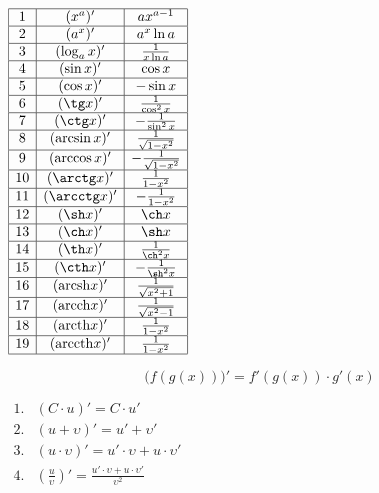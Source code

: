 \documentclass{article}
\newcommand{\arcsh}{\mathrm{arcsh}}
\newcommand{\arcch}{\mathrm{arcch}}
\newcommand{\arcth}{\mathrm{arcth}}
\newcommand{\arccth}{\mathrm{arccth}}
\begin{document}
$
\begin{array}{|c|c|c|}

  \hline
  1 &   (x^{a})'        & ax^{a-1}\\
  \hline
  2 &   (a^{x})'        & a^{x}\ln a\\
  \hline
  3 &   (\log_{a}x)'    & \frac{1}{x\ln a}\\
  \hline
  4 &   (\sin x)'       & \cos x\\
  \hline
  5 &   (\cos x)'       & -\sin x\\
  \hline
  6 &   (\tg x)'        & \frac{1}{\cos^{2} x}\\
  \hline
  7 &   (\ctg x)'       & -\frac{1}{\sin^{2} x}\\
  \hline
  8 &   (\arcsin x)'    & \frac{1}{\sqrt{1-x^{2}}}\\
  \hline
  9 &   (\arccos x)'    & -\frac{1}{\sqrt{1-x^{2}}}\\
  \hline
  10& (\arctg x)'       & \frac{1}{1-x^{2}}\\
  \hline
  11& (\arcctg x)'      & -\frac{1}{1-x^{2}}\\
  \hline
  12& (\sh x)'          & \ch x\\
  \hline
  13& (\ch x)'          & \sh x\\
  \hline
  14& (\th x)'          & \frac{1}{\ch^{2} x}\\
  \hline
  15& (\cth x)'         & -\frac{1}{\sh^{2} x}\\
  \hline
  16& (\arcsh x)'       & \frac{1}{\sqrt{x^{2}+1}}\\
  \hline
  17& (\arcch x)'       & \frac{1}{\sqrt{x^{2}-1}}\\
  \hline
  18& (\arcth x)'       & \frac{1}{1-x^{2}}\\
  \hline
  19& (\arccth x)'      & \frac{1}{1-x^{2}}\\
  \hline

\end{array}
$

\[   \Big(f(g(x))\Big) ' = f'(g(x)) \cdot g'(x)  \]

$
\begin{array}{cl}

  1.&  (C\cdot u)'                         =   C\cdot u'\\
  2.&  \left(u + \upsilon       \right)'   =   u' + \upsilon'\\
  3.&  \left(u\cdot \upsilon    \right)'   =   u'\cdot\upsilon + u\cdot\upsilon' \\
  4.&  \left(\frac{u}{\upsilon} \right)'   =   \frac{u'\cdot\upsilon + u\cdot\upsilon'}{\upsilon^2}\\

\end{array}
$
\end{document}
